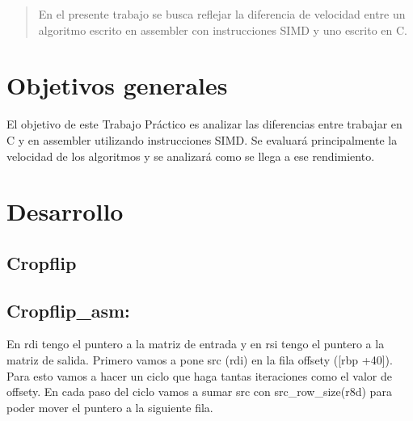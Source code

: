 \documentclass[a4paper]{article}
\begin{document}
\thispagestyle{empty}

\maketitle
\newpage

\thispagestyle{empty}
\vfill
\begin{abstract}
En el presente trabajo se busca reflejar la diferencia de velocidad entre un algoritmo escrito en assembler con instrucciones SIMD y uno escrito en C.
\end{abstract}

\thispagestyle{empty}
\vspace{3cm}
\tableofcontents
\newpage


\newpage

\section{Objetivos generales}

El objetivo de este Trabajo Práctico es analizar las diferencias entre trabajar en C y en assembler utilizando instrucciones SIMD. 
Se evaluará principalmente la velocidad de los algoritmos y se analizará como se llega a ese rendimiento.


\newpage

%
%
\newpage

\section{Desarrollo}

\subsection{Cropflip}
\subsection{Cropflip\_asm:}

En rdi tengo el puntero a la matriz de entrada y en rsi tengo el puntero a la matriz de salida.\newline
Primero vamos a pone src (rdi) en la fila offsety ([rbp +40]). \newline
Para esto vamos a hacer un ciclo que haga tantas iteraciones como el valor de offsety.\newline
En cada paso del ciclo vamos a sumar src con src\_row\_size(r8d) 
para poder mover el puntero a la siguiente fila.
\end{document}
